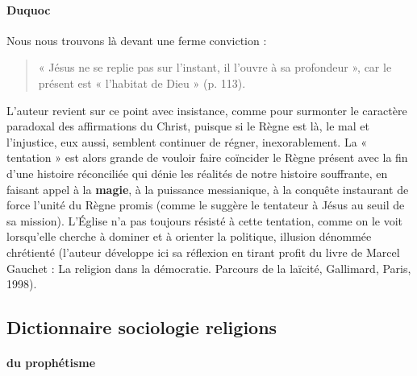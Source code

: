 \paragraph{Duquoc} Nous nous trouvons là devant une ferme conviction :

\begin{quote}
    « Jésus ne se replie pas sur l’instant, il l’ouvre à sa profondeur », car le présent est « l’habitat de Dieu » (p. 113).
\end{quote} 
L’auteur revient sur ce point avec insistance, comme pour surmonter le caractère paradoxal des affirmations du Christ, puisque si le Règne est là, le mal et l’injustice, eux aussi, semblent continuer de régner, inexorablement. La « tentation » est alors grande de vouloir faire coïncider le Règne présent avec la fin d’une histoire réconciliée qui dénie les réalités de notre histoire souffrante, en faisant appel à la \textbf{magie}, à la puissance messianique, à la conquête instaurant de force l’unité du Règne promis (comme le suggère le tentateur à Jésus au seuil de sa mission). L’Église n’a pas toujours résisté à cette tentation, comme on le voit lorsqu’elle cherche à dominer et à orienter la politique, illusion dénommée chrétienté (l’auteur développe ici sa réflexion en tirant profit du livre de Marcel Gauchet : La religion dans la démocratie. Parcours de la laïcité, Gallimard, Paris, 1998).  

\subsection{Dictionnaire sociologie religions}

 \paragraph{du prophétisme }
 
